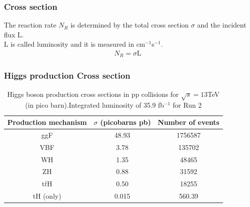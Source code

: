 \documentclass[11pt]{beamer}
\begin{document}
\begin{frame}
\frametitle{Cross section}
The reaction rate $N_R$ is determined by the total cross section $\sigma$ and the incident flux L.\\
L is called luminosity and it is measured in cm$^{-1}$s$^{-1}$.\cite{6}
\begin{align}
N_R=\sigma \text{L}
\end{align}
\end{frame}



\begin{frame}
\frametitle{Higgs production Cross section}
\begin{table}
	\caption*{Higgs boson production cross sections  in pp collisions for $\sqrt{s}=13$TeV  (in
		pico barn).Integrated luminosity of 35.9 fb$^{-1}$ for Run 2\footnotemark}
	\begin{tabular}{|c|c|c|}
		\hline
		Production mechanism &
		$\sigma$ (picobarns pb)
		&Number of events \\
		\hline
		ggF &
		48.93 &
		1756587\\
		\hline
		VBF &
		3.78&
		135702\\
		\hline
		WH & 1.35 & 48465\\
		\hline
		ZH &0.88 & 31592\\
		\hline
		t$\bar{t}$H &
		0.50&
		18255\\
		\hline
		tH	(only)&
		0.015&
		560.39\\
		\hline
	\end{tabular}
\end{table}


\end{frame}
\end{document}
